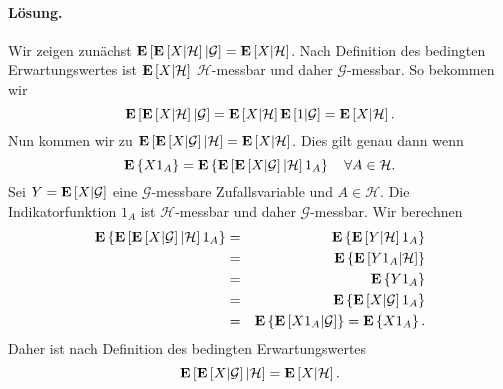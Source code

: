 \paragraph*{Lösung.} Wir zeigen zunächst 
$\mathbf{E}\left[ \mathbf{E}\left[ X | \mathcal H \right] | \mathcal G \right]=\mathbf{E} \left[ X | \mathcal H \right]$.
Nach Definition des bedingten Erwartungswertes ist $\mathbf{E}\left[ X| \mathcal H \right]$ 
$\mathcal H$-messbar und daher $\mathcal G$-messbar. So bekommen wir 
\begin{equation}
	\mathbf{E}\left[ \mathbf{E}\left[ X | \mathcal H \right] | \mathcal G \right] =
	\mathbf{E}\left[ X| \mathcal H \right] \mathbf{E}\left[ 1|\mathcal G \right] = 
	\mathbf{E} \left[ X | \mathcal H \right ].
\end{equation}
Nun kommen wir zu 
$\mathbf{E}\left[ \mathbf{E}\left[ X | \mathcal G \right] | \mathcal H \right]=\mathbf{E} \left[ X | \mathcal H \right]$.
Dies gilt genau dann wenn 
\begin{equation}
	\mathbf{E}\left\{ X 1_A \right\} 
	= \mathbf{E}\left\{ \mathbf{E}\left[ \mathbf{E}\left[ X|\mathcal G \right]|\mathcal H \right] 1_A \right\}  
	\quad \forall A\in\mathcal H.
\end{equation}
Sei $Y=\mathbf{E}\left[ X|\mathcal G \right]$ eine $\mathcal G$-messbare Zufallsvariable und
$A\in\mathcal H$. Die Indikatorfunktion $1_A$ ist $\mathcal H$-messbar und daher
$\mathcal G$-messbar. Wir berechnen
\begin{eqnarray}
	\mathbf{E}\left\{ \mathbf{E}\left[ \mathbf{E}\left[ X|\mathcal G \right]|\mathcal H \right] 1_A \right\} &=& 
	\mathbf{E}\left\{ \mathbf{E}\left[ Y|\mathcal H \right] 1_A \right\} \\
	&=& \mathbf{E}\left\{ \mathbf{E}\left[ Y 1_A| \mathcal H \right] \right\} \\
	&=& \mathbf{E}\left\{ Y 1_A \right\} \\
	&=& \mathbf{E}\left\{ \mathbf{E}\left[ X|\mathcal G \right] 1_A \right\} \\
	&=& \mathbf{E}\left\{ \mathbf{E}\left[ X 1_A| \mathcal G \right] \right\} = \mathbf{E}\left\{ X 1_A \right\}. 
\end{eqnarray}
Daher ist nach Definition des bedingten Erwartungswertes
\begin{equation}
	\mathbf{E}\left[ \mathbf{E}\left[ X | \mathcal G \right] | \mathcal H \right]=\mathbf{E} \left[ X | \mathcal H \right].
\end{equation}



